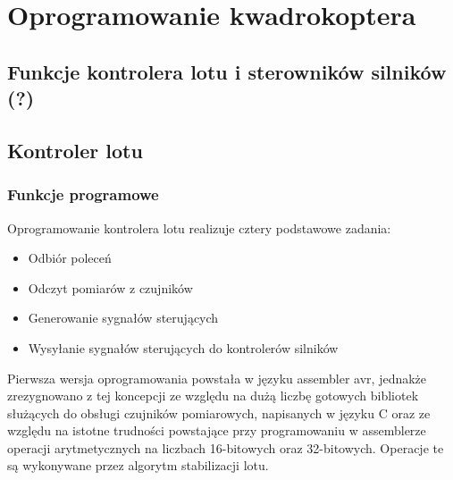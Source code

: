 
\chapter{Oprogramowanie kwadrokoptera} %

\label{Chapter6} %



\section{Funkcje kontrolera lotu i sterowników silników (?)}


\section{Kontroler lotu}

\subsection{Funkcje programowe}

Oprogramowanie kontrolera lotu realizuje cztery podstawowe zadania:

\begin{itemize}
	\item Odbiór poleceń 
	\item Odczyt pomiarów z czujników
	\item Generowanie sygnałów sterujących 
	\item Wysyłanie sygnałów sterujących do kontrolerów silników
\end{itemize}

Pierwsza wersja oprogramowania powstała w języku assembler avr, jednakże zrezygnowano z tej koncepcji ze względu na dużą liczbę gotowych bibliotek służących do obsługi czujników pomiarowych, napisanych w języku C oraz ze względu na istotne trudności powstające przy programowaniu w assemblerze operacji arytmetycznych na liczbach 16-bitowych oraz 32-bitowych. Operacje te są wykonywane przez algorytm stabilizacji lotu. 

